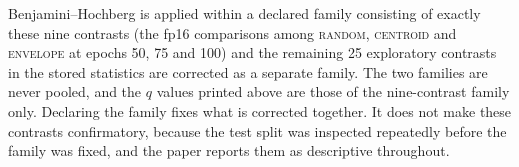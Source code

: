 \documentclass{article}
\newcommand{\ArmBest}{\textsc{centroid}}
\begin{document}
Benjamini--Hochberg is applied within a declared family consisting
of exactly these nine contrasts (the fp16 comparisons among \textsc{random},
\ArmBest{} and \textsc{envelope} at epochs 50, 75 and 100) and the remaining
25 exploratory contrasts in the stored statistics are corrected as a separate
family. The two families are never pooled, and the $q$ values printed above are
those of the nine-contrast family only. Declaring the family fixes what is
corrected together. It does not make these contrasts confirmatory, because the
test split was inspected repeatedly before the family was fixed, and the paper
reports them as descriptive throughout.


\end{document}
